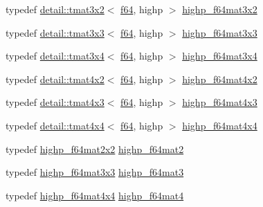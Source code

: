 \begin{DoxyCompactItemize}
\item 
typedef \hyperlink{structglm_1_1detail_1_1tmat3x2}{detail\+::tmat3x2}$<$ \hyperlink{group__gtc__type__precision_ga2bba392e555124b36cde6abba349bab3}{f64}, highp $>$ \hyperlink{group__gtc__type__precision_ga5cdc9d6fb9ce07e5485c4e2db919ce7e}{highp\+\_\+f64mat3x2}
\item 
typedef \hyperlink{structglm_1_1detail_1_1tmat3x3}{detail\+::tmat3x3}$<$ \hyperlink{group__gtc__type__precision_ga2bba392e555124b36cde6abba349bab3}{f64}, highp $>$ \hyperlink{group__gtc__type__precision_gaf520a9307867c632408029a53af3e375}{highp\+\_\+f64mat3x3}
\item 
typedef \hyperlink{structglm_1_1detail_1_1tmat3x4}{detail\+::tmat3x4}$<$ \hyperlink{group__gtc__type__precision_ga2bba392e555124b36cde6abba349bab3}{f64}, highp $>$ \hyperlink{group__gtc__type__precision_ga4144f547189dd7e52b4dd282f41a1cd1}{highp\+\_\+f64mat3x4}
\item 
typedef \hyperlink{structglm_1_1detail_1_1tmat4x2}{detail\+::tmat4x2}$<$ \hyperlink{group__gtc__type__precision_ga2bba392e555124b36cde6abba349bab3}{f64}, highp $>$ \hyperlink{group__gtc__type__precision_gabe9bc3680e7d83a7b34297da518a8117}{highp\+\_\+f64mat4x2}
\item 
typedef \hyperlink{structglm_1_1detail_1_1tmat4x3}{detail\+::tmat4x3}$<$ \hyperlink{group__gtc__type__precision_ga2bba392e555124b36cde6abba349bab3}{f64}, highp $>$ \hyperlink{group__gtc__type__precision_ga0264562b4667b8073b7708efc2280691}{highp\+\_\+f64mat4x3}
\item 
typedef \hyperlink{structglm_1_1detail_1_1tmat4x4}{detail\+::tmat4x4}$<$ \hyperlink{group__gtc__type__precision_ga2bba392e555124b36cde6abba349bab3}{f64}, highp $>$ \hyperlink{group__gtc__type__precision_gaa95b52552df369b75d09155ebb29b1bd}{highp\+\_\+f64mat4x4}
\item 
typedef \hyperlink{group__gtc__type__precision_ga4babca568fc88f185620c02e4fdac0d8}{highp\+\_\+f64mat2x2} \hyperlink{group__gtc__type__precision_ga7d9fd446fd43310ba6f63c8f9468acc0}{highp\+\_\+f64mat2}
\item 
typedef \hyperlink{group__gtc__type__precision_gaf520a9307867c632408029a53af3e375}{highp\+\_\+f64mat3x3} \hyperlink{group__gtc__type__precision_ga00c5743b0eba6b437422571f4eda27b8}{highp\+\_\+f64mat3}
\item 
typedef \hyperlink{group__gtc__type__precision_gaa95b52552df369b75d09155ebb29b1bd}{highp\+\_\+f64mat4x4} \hyperlink{group__gtc__type__precision_ga1ac5d0564721a22765c68c54a0a4f87a}{highp\+\_\+f64mat4}
\item 

\end{DoxyCompactItemize}
